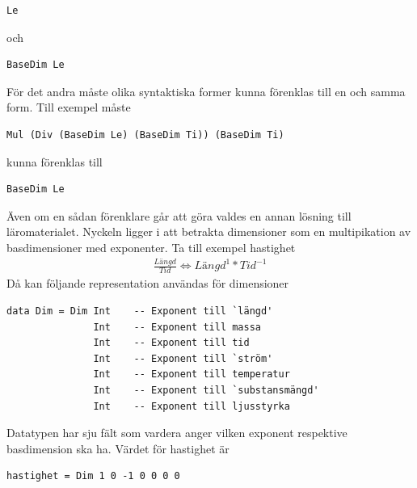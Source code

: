 \begin{draft}
\begin{lstlisting}[frame=none, belowskip=-0.5\baselineskip, xleftmargin=0.5in]
Le
\end{lstlisting}

och

\begin{lstlisting}[frame=none, belowskip=-0.5\baselineskip, xleftmargin=0.5in]
BaseDim Le
\end{lstlisting}

För det andra måste olika syntaktiska former kunna förenklas till en och samma
form. Till exempel måste

\begin{lstlisting}[frame=none, belowskip=-0.5\baselineskip, xleftmargin=0.5in]
Mul (Div (BaseDim Le) (BaseDim Ti)) (BaseDim Ti)
\end{lstlisting}

kunna förenklas till

\begin{lstlisting}[frame=none, belowskip=-0.5\baselineskip, xleftmargin=0.5in]
BaseDim Le
\end{lstlisting}

Även om en sådan förenklare går att göra valdes en annan lösning till
läromaterialet. Nyckeln ligger i att betrakta dimensioner som en multipikation
av basdimensioner med exponenter. Ta till exempel hastighet
\begin{align*}
  \frac{Längd}{Tid} \iff Längd^1 * Tid^{-1}
\end{align*}
Då kan följande representation användas för dimensioner

\begin{lstlisting}[frame=none, belowskip=-0.5\baselineskip, xleftmargin=0.5in]
data Dim = Dim Int    -- Exponent till `längd'
               Int    -- Exponent till massa
               Int    -- Exponent till tid
               Int    -- Exponent till `ström'
               Int    -- Exponent till temperatur
               Int    -- Exponent till `substansmängd'
               Int    -- Exponent till ljusstyrka
\end{lstlisting}

Datatypen har sju fält som vardera anger vilken exponent respektive
basdimension ska ha. Värdet för hastighet är

\begin{lstlisting}[frame=none, belowskip=-0.5\baselineskip, xleftmargin=0.5in]
hastighet = Dim 1 0 -1 0 0 0 0
\end{lstlisting}


\end{draft}
